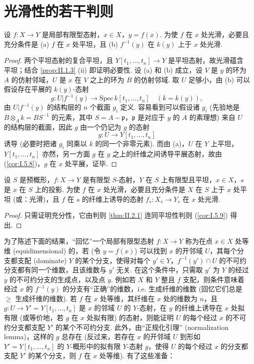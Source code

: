 \section{光滑性的若干判则}

\begin{theorem}\label{thm:II.2.1}
设 $f \colon X \to Y$ 是局部有限型态射，$x \in X$，$y = f(x)$. 为使 $f$ 在 $x$ 处光滑，必要且充分条件是 (a) $f$ 在 $x$ 处平坦，且 (b) $f^{-1}(y)$ 在 $k(y)$ 上于 $x$ 处光滑.
\end{theorem}

\begin{proof}
两个平坦态射的复合平坦，且 $Y[t_1, \dots, t_n] \to Y$ 是平坦态射，故光滑蕴含平坦；结合 \ref{prop:II.1.3} (ii) 即证明必要性. 设 (a) 和 (b) 成立，设 $V$ 是 $y$ 的环为 $A$ 的仿射邻域，$U$ 是 $x$ 在 $V$ 之上的环为 $B$ 的仿射邻域. 取 $U$ 足够小，由 (b) 可以假设存在平展的 $k(y)$-态射
\[
g \colon U|f^{-1}(y) \longrightarrow \mathrm{Spec}\, k[t_1, \dots, t_n] \quad (k = k(y)),
\]
由 $U|f^{-1}(y)$ 的结构层的 $n$ 个截面 $g_i$ 定义. 容易看到可以假设诸 $g_i$ (先验地是 $B \otimes_A k = BS^{-1}$ 的元素，其中 $S = A - \mathfrak{p}$，$\mathfrak{p}$ 是对应于 $y$ 的 $A$ 的素理想) 来自 $U$ 的结构层的截面，因此 $g$ 由一个仍记为 $g$ 的态射
\[
g \colon U \longrightarrow Y[t_1, \dots, t_n]
\]
诱导 (必要时把诸 $g_i$ 同乘以 $k$ 的同一个非零元素). 而由 (a)，$U$ 在 $Y$ 上平坦，$Y[t_1, \dots, t_n]$ 亦然，另一方面 $g$ 在 $y$ 之上的纤维之间诱导平展态射，故由 (\ref{cor:I.5.8})，$g$ 在 $x$ 处平展，证毕.
\end{proof}

\begin{corollary}\label{cor:II.2.2}
设 $S$ 是预概形，$f \colon X \to Y$ 是有限型 $S$-态射，$Y$ 在 $S$ 上有限型且平坦，$x \in X$，$s$ 是 $x$ 在 $S$ 上的投影. 为使 $f$ 在 $x$ 处光滑，必要且充分条件是 $X$ 在 $S$ 上于 $x$ 处平坦 (或：光滑)，且 $f$ 在 $s$ 的纤维上诱导的态射 $f_s \colon X_s \to Y_s$ 在 $x$ 处光滑.
\end{corollary}

\begin{proof}
只需证明充分性，它由判则 \ref{thm:II.2.1} 连同平坦性判则 (\ref{cor:I.5.9}) 得出.
\end{proof}

为了陈述下面的结果，``回忆''一个局部有限型态射 $f \colon X \to Y$ 称为在点 $x \in X$ 处等维 (equidimensional) 的，若 (令 $y = f(x)$) 可以找到 $x$ 的开邻域 $U$，其每个分支都支配 (dominate) $Y$ 的某个分支，使得对每个 $y' \in Y$，$f^{-1}(y') \cap U$ 的不可约分支都有同一个维数，且该维数与 $y'$ 无关. 在这个条件中，只需取 $y'$ 为 $Y$ 的经过 $y$ 的不可约分支的生成点，以及点 $y$. 例如若 $X$ 和 $Y$ 整且 $f$ 支配，则条件意味着经过 $x$ 的 $f^{-1}(y)$ 的分支有``正确''的维数，i.e. 生成纤维的维数 (回忆它们总是 $\geqslant$ 生成纤维的维数). 若 $f$ 在 $x$ 处等维，其纤维在 $x$ 处的维数为 $n$，且 $g \colon U \to Y' = Y[t_1, \dots, t_n]$ 是 $x$ 的邻域 $U$ 的 $Y$-态射，在 $y$ 的纤维上诱导在 $x$ 处拟有限 (或等价地，若 $g$ 在 $x$ 处拟有限) 的态射，则能证明 $U$ 的每个经过 $x$ 的不可约分支都支配 $Y'$ 的某个不可约分支. 此外，由``正规化引理'' (normalization lemma)，这样的 $g$ 总存在 (反过来，若存在 $x$ 的开邻域 $U$ 到形如 $Y' = Y[t_1, \dots, t_n]$ 的 $Y$-概形中的拟有限 $Y$-态射 $g$，使得 $U$ 的每个经过 $x$ 的分支都支配 $Y'$ 的某个分支，则 $f$ 在 $x$ 处等维). 有了这些准备：

